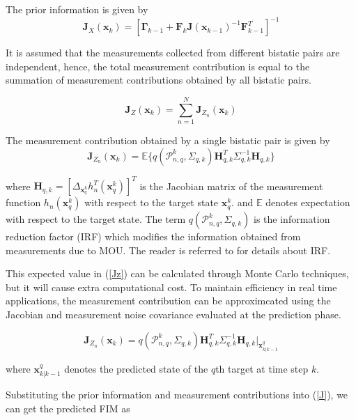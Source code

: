 \documentclass[12pt,journal,draftclsnofoot,onecolumn]{IEEEtran}
\begin{document}
The prior information is given by
\begin{equation}
    \mathbf{J}_X(\mathbf{x}_k)=[\mathbf{\Gamma}_{k-1}+\mathbf{F}_k\mathbf{J}(\mathbf{x}_{k-1})^{-1}\mathbf{F}_{k-1}^T]^{-1}
\end{equation}

It is assumed that the measurements collected from different bistatic pairs are independent, hence, the total measurement contribution is equal to the summation of measurement contributions obtained by all bistatic pairs.

\begin{equation}
    \mathbf{J}_Z(\mathbf{x}_k)=\sum_{n=1}^N\mathbf{J}_{Z_{n}}(\mathbf{x}_k)
\end{equation}

The measurement contribution obtained by a single bistatic pair is given by
\begin{equation}
    \mathbf{J}_{Z_{n}}(\mathbf{x}_k)=\mathbb{E}\{q(\mathcal{P}_{n,q}^k,\Sigma_{q,k})\mathbf{H}_{q,k}^T\Sigma_{q,k}^{-1}\mathbf{H}_{q,k}\}
    \label{Jz}
\end{equation}

where $\mathbf{H}_{q,k}=[\Delta_{\mathbf{x}_q^k}h_n^T(\mathbf{x}_q^k)]^T$ is the Jacobian matrix of the measurement function $h_n(\mathbf{x}_q^k)$ with respect to the target state $\mathbf{x}_q^k$. and $\mathbb{E}$ denotes expectation with respect to the target state. The term $q(\mathcal{P}_{n,q}^k,\Sigma_{q,k})$ is the information reduction factor (IRF)\cite{niu2001matrix} which modifies the information obtained from measurements due to MOU. The reader is referred to \cite{tharmarasa2007pcrlb,hernandez2004multisensor} for details about IRF.

This expected value in (\ref{Jz}) can be calculated through Monte Carlo techniques, but it will cause extra computational cost. To maintain efficiency in real time applications, the measurement contribution can be approximcated using the Jacobian and measurement noise covariance evaluated at the prediction phase.

\begin{equation}
	\mathbf{J}_{Z_{n}}(\mathbf{x}_k)=q(\mathcal{P}_{n,q}^k,\Sigma_{q,k})\mathbf{H}_{q,k}^T\Sigma_{q,k}^{-1}\mathbf{H}_{q,k}\bigg|_{\mathbf{x}_{k|k-1}^q}	
\end{equation}

where $\mathbf{x}_{k|k-1}^q$ denotes the predicted state of the $q$th target at time step $k$. 

Substituting the prior information and measurement contributions into (\ref{J}), we can get the predicted FIM as
\end{document}
